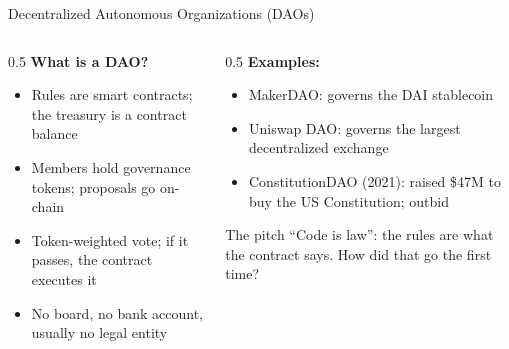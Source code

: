 \ifdefined\PRESENTATION\else\PassOptionsToClass{handout}{beamer}\fi\documentclass[aspectratio=169, lualatex]{beamer}
\begin{document}
\begin{frame}{Decentralized Autonomous Organizations (DAOs)}
	\begin{columns}[c]
		\begin{column}{0.5\textwidth}
			\textbf{What is a DAO?}
			\begin{itemize}
				\item Rules are smart contracts; the treasury is a contract balance
				\item Members hold governance tokens; proposals go on-chain
				\item Token-weighted vote; if it passes, the contract executes it
				\item No board, no bank account, usually no legal entity
			\end{itemize}
		\end{column}
		\begin{column}{0.5\textwidth}
			\textbf{Examples:}
			\begin{itemize}
				\item MakerDAO: governs the DAI stablecoin
				\item Uniswap DAO: governs the largest decentralized exchange
				\item ConstitutionDAO (2021): raised \$47M to buy the US Constitution; outbid
			\end{itemize}
			\begin{exampleblock}{The pitch}
				``Code is law'': the rules are what the contract says. How did that go the first time?
			\end{exampleblock}
		\end{column}
	\end{columns}
\end{frame}
\end{document}
